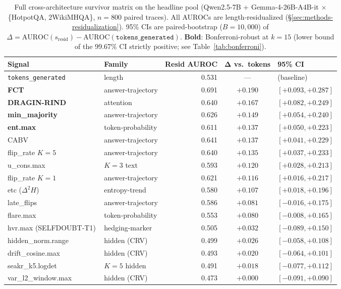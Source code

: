 \documentclass[11pt]{article}
\begin{document}
\begin{table}[t]
\centering\small
\begin{tabular}{@{}llrcl@{}}
\toprule
\textbf{Signal} & \textbf{Family} & \textbf{Resid AUROC} & $\boldsymbol{\Delta}$ \textbf{vs.\ tokens} & \textbf{95\% CI} \\
\midrule
\texttt{tokens\_generated} & length            & 0.531 & --- & (baseline) \\
\midrule
\textbf{FCT}              & answer-trajectory & 0.691 & $+0.190$ & $[+0.093, +0.287]$ \\
\textbf{DRAGIN-RIND}      & attention         & 0.640 & $+0.167$ & $[+0.082, +0.249]$ \\
\textbf{min\_majority}    & answer-trajectory & 0.626 & $+0.149$ & $[+0.054, +0.240]$ \\
\textbf{ent.max}          & token-probability & 0.611 & $+0.137$ & $[+0.050, +0.223]$ \\
CABV                      & answer-trajectory & 0.641 & $+0.137$ & $[+0.041, +0.229]$ \\
flip\_rate $K{=}5$        & answer-trajectory & 0.640 & $+0.135$ & $[+0.037, +0.233]$ \\
u\_cons.max               & $K{=}3$ text      & 0.593 & $+0.120$ & $[+0.028, +0.213]$ \\
flip\_rate $K{=}1$        & answer-trajectory & 0.621 & $+0.116$ & $[+0.016, +0.217]$ \\
etc ($\Delta^2 H$)        & entropy-trend     & 0.580 & $+0.107$ & $[+0.018, +0.196]$ \\
\midrule
late\_flips               & answer-trajectory & 0.586 & $+0.081$ & $[-0.016, +0.175]$ \\
flare.max                 & token-probability & 0.553 & $+0.080$ & $[-0.008, +0.165]$ \\
hvr.max (SELFDOUBT-T1)\,\citep{pandey_selfdoubt_2026}    & hedging-marker    & 0.505 & $+0.032$ & $[-0.089, +0.150]$ \\
hidden\_norm.range        & hidden (CRV)      & 0.499 & $+0.026$ & $[-0.058, +0.108]$ \\
drift\_cosine.max         & hidden (CRV)      & 0.493 & $+0.020$ & $[-0.064, +0.101]$ \\
seakr\_k5.logdet          & $K{=}5$ hidden    & 0.491 & $+0.018$ & $[-0.077, +0.112]$ \\
var\_l2\_window.max       & hidden (CRV)      & 0.473 & $+0.000$ & $[-0.091, +0.090]$ \\
\bottomrule
\end{tabular}
\caption{Full cross-architecture survivor matrix on the headline pool (Qwen2.5-7B + Gemma-4-26B-A4B-it $\times$ \{HotpotQA, 2WikiMHQA\}, $n{=}800$ paired traces). All AUROCs are length-residualized (\S\ref{sec:methods-residualization}). 95\% CIs are paired-bootstrap ($B{=}10{,}000$) of $\Delta = \mathrm{AUROC}(s_{\text{resid}}) - \mathrm{AUROC}(\texttt{tokens\_generated})$. \textbf{Bold}: Bonferroni-robust at $k{=}15$ (lower bound of the 99.67\% CI strictly positive; see Table~\ref{tab:bonferroni}).}
\label{tab:hero-full}
\end{table}
\end{document}
